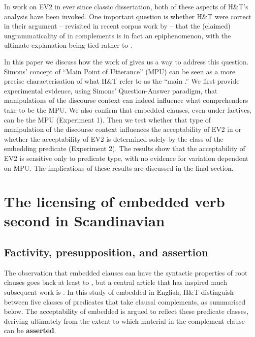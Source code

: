 \documentclass[output=paper]{langsci/langscibook}
\begin{document}
In work on EV2 in  ever since  classic dissertation, both of these aspects of H\&T's analysis have been invoked. One important {question} is whether H\&T were correct in their argument -- revisited in recent corpus work by \cite{JensenChristensen2013} -- that the (claimed) ungrammaticality of  in  complements is in fact an epiphenomenon, with the ultimate explanation being tied rather to .

In this paper we discuss how the work of \cite{Simons2007} 
gives us a way to address this {question}. Simons' concept of ``Main Point of Utterance'' (MPU) can be seen as a more precise characterisation of what H\&T refer to as the ``main .''  We first provide experimental evidence, using Simons' Question-Answer paradigm, that manipulations of the discourse context can indeed influence what comprehenders take to be the MPU. We also confirm that embedded clauses, even under factives, can be the MPU (Experiment 1). Then we test whether that type of manipulation of the discourse context influences the acceptability of EV2 in  or whether the acceptability of EV2 is determined solely by the class of the embedding predicate (Experiment 2).  The results show that the acceptability of EV2 is sensitive only to predicate type, with no evidence for  variation dependent on MPU. The implications of these results are discussed in the final section.


\section{The licensing of embedded verb second in Scandinavian}

\subsection{Factivity, presupposition, and assertion}
\label{sec:factivity}

The observation that embedded clauses can have the syntactic properties of root clauses goes back at least to \cite{Emonds1970}, but a central article that has inspired much subsequent work is \cite{HooperThompson1973}. In this study of embedded  in English, H\&T distinguish between five classes of predicates that take clausal complements, as summarised below.  The acceptability of embedded  is argued to reflect these predicate classes, deriving ultimately from the extent to which material in the complement clause can be \textbf{asserted}.\newpage
\end{document}
